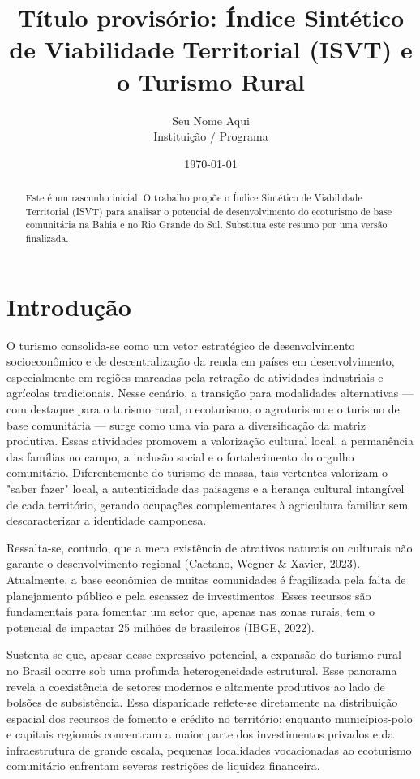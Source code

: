 \documentclass[a4paper,12pt]{article}
\title{Título provisório: Índice Sintético de Viabilidade Territorial (ISVT) e o Turismo Rural}
\author{Seu Nome Aqui \\ \small{Instituição / Programa}}
\date{\today}
\begin{document}
\maketitle

\begin{abstract}
Este é um rascunho inicial. O trabalho propõe o Índice Sintético de Viabilidade Territorial (ISVT) para analisar o potencial de desenvolvimento do ecoturismo de base comunitária na Bahia e no Rio Grande do Sul. Substitua este resumo por uma versão finalizada.
\end{abstract}

\section{Introdução}

O turismo consolida-se como um vetor estratégico de desenvolvimento socioeconômico e de descentralização da renda em países em desenvolvimento, especialmente em regiões marcadas pela retração de atividades industriais e agrícolas tradicionais. Nesse cenário, a transição para modalidades alternativas — com destaque para o turismo rural, o ecoturismo, o agroturismo e o turismo de base comunitária — surge como uma via para a diversificação da matriz produtiva. Essas atividades promovem a valorização cultural local, a permanência das famílias no campo, a inclusão social e o fortalecimento do orgulho comunitário. Diferentemente do turismo de massa, tais vertentes valorizam o "saber fazer" local, a autenticidade das paisagens e a herança cultural intangível de cada território, gerando ocupações complementares à agricultura familiar sem descaracterizar a identidade camponesa.

Ressalta-se, contudo, que a mera existência de atrativos naturais ou culturais não garante o desenvolvimento regional (Caetano, Wegner \& Xavier, 2023). Atualmente, a base econômica de muitas comunidades é fragilizada pela falta de planejamento público e pela escassez de investimentos. Esses recursos são fundamentais para fomentar um setor que, apenas nas zonas rurais, tem o potencial de impactar 25 milhões de brasileiros (IBGE, 2022).

Sustenta-se que, apesar desse expressivo potencial, a expansão do turismo rural no Brasil ocorre sob uma profunda heterogeneidade estrutural. Esse panorama revela a coexistência de setores modernos e altamente produtivos ao lado de bolsões de subsistência. Essa disparidade reflete-se diretamente na distribuição espacial dos recursos de fomento e crédito no território: enquanto municípios-polo e capitais regionais concentram a maior parte dos investimentos privados e da infraestrutura de grande escala, pequenas localidades vocacionadas ao ecoturismo comunitário enfrentam severas restrições de liquidez financeira.
\end{document}
